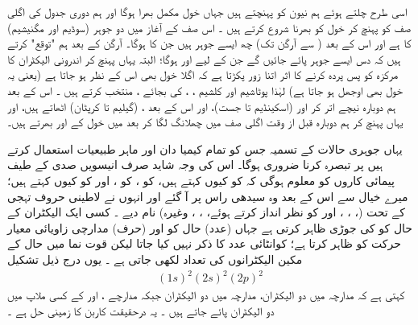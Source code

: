  
 اسی طرح چلتے ہوئے ہم  نیون     کو  پہنچتے ہیں جہاں      خول مکمل بھرا ہوگا اور ہم دوری جدول کی اگلی صف کو پہنچ کر      خول کو بھرنا شروع کرتے ہیں ۔ اس صف کے آغاز میں دو جوہر (سوڈیم اور مگنیشیم)   کا     ہے اور اس کے بعد (  سے آرگن تک) چھ ایسے جوہر ہیں جن کا    ہوگا۔ آرگن کے بعد ہم "توقع" کرتے ہیں کہ دس ایسے جوہر پائے جائیں گے جن کے لیے        اور        ہوگا؛ البتہ یہاں پہنچ کر   اندرونی الیکٹران کا مرکزہ کو پس پردہ کرنے کا اثر اتنا زور پکڑتا ہے کہ اگلا خول بھی اس کے نظر ہو جاتا ہے (یعنی یہ خول بھی  اوجھل ہو  جاتا ہے)   لہٰذا  پوٹاشیم      اور کلشیم      ،   ،    کی
  بجائے  ،    منتخب کرتے ہیں  ۔ اس کے بعد ہم  دوبارہ نیچے اتر کر      اور   (اسکینڈیم تا   جست)،  اور اس کے بعد ،  (گیلیم تا  کرپٹان) اٹھاتے ہیں، اور یہاں پہنچ کر  ہم دوبارہ قبل از وقت اگلی صف       میں چھلانگ لگا کر  بعد میں   خول کے  اور  بھرتے ہیں۔
  
 یہاں جوہری حالات کے  تسمیہ  جس کو  تمام  کیمیا دان  اور ماہر طبیعیات  استعمال کرتے ہیں پر تبصرہ کرنا ضروری ہوگا۔ اس کی وجہ شاید صرف انیسویں صدی کے طیف  پیمائی  کاروں کو معلوم ہوگی کہ        کو کیوں           کہتے ہیں،            کو           ،           کو    ، اور                 کو کیوں     کہتے ہیں؛ میرے خیال سے اس کے بعد وہ سیدھی راس پر آ گئے اور انہوں نے لاطینی  حروف تہجی کے تحت (، ، ،  اور            کو نظر انداز کرتے ہوئے،  ،  ، وغیرہ)  نام دیے ۔ کسی ایک الیکٹران کے حال کو           کی جوڑی ظاہر کرتی ہے جہاں  (عدد)     حال کو اور (حرف)             مدارچی زاویائی معیار حرکت کو ظاہر کرتا ہے؛ کوانٹائی عدد            کا  ذکر نہیں کیا جاتا لیکن قوت نما میں حال کے مکین الیکٹرانوں کی تعداد لکھی جاتی ہے ۔ یوں درج ذیل تشکیل
\begin{align}\label{مساوات_متماثل_الیکٹرانی_تشکیل}
(1s)^{2}(2s)^{2}(2p)^{2} 
\end{align}
کہتی ہے کہ مدارچہ   میں  دو  الیکٹران،  مدارچہ   میں  دو الیکٹران   جبکہ مدارچے   ،    اور    کے کسی ملاپ میں  دو   الیکٹران پائے جاتے ہیں ۔ یہ درحقیقت کاربن کا زمینی حل ہے ۔ 


